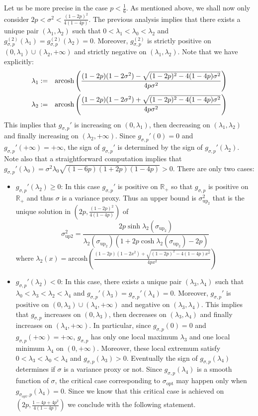 \documentclass[a4paper, 10pt]{article}
\newcommand{\arcosh}{\text{arcosh}}
\newcommand{\beq}{\begin{equation}}
\newcommand{\eeq}{\end{equation}}
\newcommand{\bea}{\begin{eqnarray}}
\newcommand{\eea}{\end{eqnarray}}
\theoremstyle{definition}
\begin{document}
Let us be more precise in the case $p<\frac{1}{6}$. As mentioned above, we shall now only consider $2p<\sigma^2<\frac{(1-2p)^2}{4(1-4p)}$. The previous analysis implies that there exists a unique pair $(\lambda_1,\lambda_2)$ such that $0<\lambda_1<\lambda_0<\lambda_2$ and $g_{\sigma,p}^{(2)}(\lambda_1)=g_{\sigma,p}^{(2)}(\lambda_2)=0$. Moreover, $g_{\sigma,p}^{(2)}$ is strictly positive on $(0,\lambda_1)\cup(\lambda_2,+\infty)$ and strictly negative on $(\lambda_1,\lambda_2)$. 
Note that we have explicitly:
\bea \lambda_1&:=&\arcosh\left(  \frac{(1-2p)(1-2\sigma^2)-\sqrt{(1-2p)^2-4(1-4p)\sigma^2 } }{4p\sigma^2}\right)\cr
\lambda_2&:=&\arcosh\left(  \frac{(1-2p)(1-2\sigma^2)+\sqrt{(1-2p)^2-4(1-4p)\sigma^2 } }{4p\sigma^2}\right)
\eea
This implies that $g_{\sigma,p}'$ is increasing on $(0,\lambda_1)$, then decreasing on $(\lambda_1,\lambda_2)$ and finally increasing on $(\lambda_2,+\infty)$. Since $g_{\sigma,p}'(0)=0$ and $g_{\sigma,p}'(+\infty)=+\infty$, the sign of $g_{\sigma,p}'$ is determined by the sign of $g_{\sigma,p}'(\lambda_2)$. Note also that a straightforward computation implies that $g_{\sigma,p}'(\lambda_0)=\sigma^2 \lambda_0\sqrt{(1-6p)(1+2p)(1-4p)}>0$. There are only two cases:
\begin{itemize}
\item $g_{\sigma,p}'(\lambda_2)\geq 0$: In this case $g_{\sigma,p}'$ is positive on $\mathbb{R}_+$ so that $g_{\sigma,p}$ is positive on $\mathbb{R}_+$ and thus $\sigma$ is a variance proxy. Thus an upper bound is $\sigma^2_{\text{up}_2}$ that is the unique solution in $\left(2p,\frac{(1-2p)^2}{4(1-4p)}\right)$ of 
\beq \sigma^2_{\text{up2}}=\frac{2p\sinh\lambda_2(\sigma_{\text{up}_2})}{\lambda_2(\sigma_{\text{up}_2}) (1+2p\cosh \lambda_2(\sigma_{\text{up}_2})-2p) }\eeq
where $\lambda_2(x)=\arcosh\left(  \frac{(1-2p)(1-2x^2)+\sqrt{(1-2p)^2-4(1-4p)x^2 } }{4px^2}\right)$
\item $g_{\sigma,p}'(\lambda_2)<0$: In this case, there exists a unique pair $(\lambda_3,\lambda_4)$ such that $\lambda_0<\lambda_3<\lambda_2<\lambda_4$ and $g_{\sigma,p}'(\lambda_3)=g_{\sigma,p}'(\lambda_4)=0$. Moreover, $g_{\sigma,p}'$ is positive on $(0,\lambda_3)\cup(\lambda_4,+\infty)$ and negative on $(\lambda_3,\lambda_4)$. This implies that $g_{\sigma,p}$ increases on $(0,\lambda_3)$, then decreases on $(\lambda_3,\lambda_4)$ and finally increases on $(\lambda_4,+\infty)$. In particular, since $g_{\sigma,p}(0)=0$ and $g_{\sigma,p}(+\infty)=+\infty$, $g_{\sigma,p}$ has only one local maximum $\lambda_3$ and one local minimum $\lambda_4$ on $(0,+\infty)$. Moreover, these local extremum satisfy $0<\lambda_3<\lambda_0<\lambda_4$ and $g_{\sigma,p}(\lambda_3)>0$. Eventually the sign of $g_{\sigma,p}(\lambda_4)$ determines if $\sigma$ is a variance proxy or not. Since $g_{\sigma,p}(\lambda_4)$ is a smooth function of $\sigma$, the critical case corresponding to $\sigma_{\mathrm{opt}}$ may happen only when $g_{\sigma_{\mathrm{opt}},p}(\lambda_4)=0$. Since we know that this critical case is achieved on $\left(2p,\frac{1-4p+4p^2}{4(1-4p)}\right)$ we conclude with the following statement.
\end{itemize}
\end{document}
